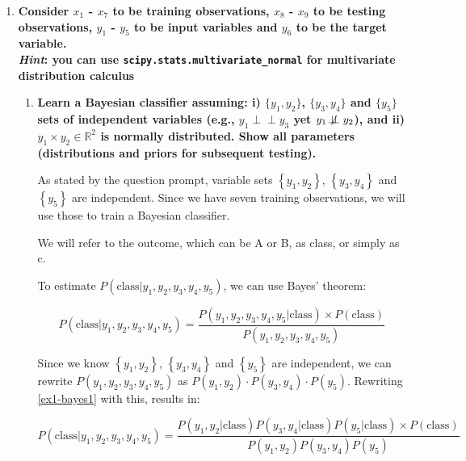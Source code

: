 \documentclass[12pt]{article}
\newcommand{\ind}{\perp\!\!\!\perp}
\begin{document}
\begin{enumerate}[leftmargin=\labelsep]
    \item \textbf{Consider $x_1$ - $x_7$ to be training observations, $x_8$ - $x_9$ to be testing observations, $y_1$ - $y_5$ to be input
          variables and $y_6$ to be the target variable.\\
          \textit{Hint}: you can use \texttt{scipy.stats.multivariate\_normal} for multivariate distribution calculus}
          \begin{enumerate}
          \item \textbf{Learn a Bayesian classifier assuming: i) $\{y_1, y_2\}$, $\{y_3, y_4\}$ and $\{y_5\}$ sets of independent
                variables (e.g., $y_1 \ind y_3$ yet $y_1 \not\!\ind y_2$), and ii) $y_1 \times y_2 \in \mathbb{R}^{2}$ is normally distributed. Show all
                parameters (distributions and priors for subsequent testing).}

          \vskip 0.3cm
          As stated by the question prompt, variable sets \(\left\{y_1, y_2\right\}\), \(\left\{y_3, y_4\right\}\) and \(\left\{y_5\right\}\) are independent.
          Since we have seven training observations, we will use those to train a Bayesian classifier.

          We will refer to the outcome, which can be A or B, as class, or simply as c.

          To estimate $P(\text{class} | y_1, y_2, y_3, y_4, y_5)$, we can use Bayes' theorem:

          \begin{equation}\label{ex1-bayes1}
              P(\text{class}| y_1, y_2, y_3, y_4, y_5) = \frac{P(y_1, y_2, y_3, y_4, y_5 | \text{class}) \times P(\text{class})}{P(y_1, y_2, y_3, y_4, y_5)}
          \end{equation}

          Since we know $\left\{y_1, y_2\right\}$, $\left\{y_3, y_4\right\}$ and $\left\{y_5\right\}$ are independent,
          we can rewrite $P(y_1, y_2, y_3, y_4, y_5)$ as $P(y_1, y_2) \cdot P(y_3, y_4) \cdot P(y_5)$.
          Rewriting \eqref{ex1-bayes1} with this, results in:

          \begin{equation}\label{ex1-bayes2}
              P(\text{class}| y_1, y_2, y_3, y_4, y_5) = \frac{P(y_1, y_2 | \text{class}) P(y_3, y_4 | \text{class}) P(y_5 | \text{class}) \times P(\text{class})}{P(y_1, y_2)P(y_3, y_4)P(y_5)}
          \end{equation}


\end{enumerate}
\end{enumerate}
\end{document}
